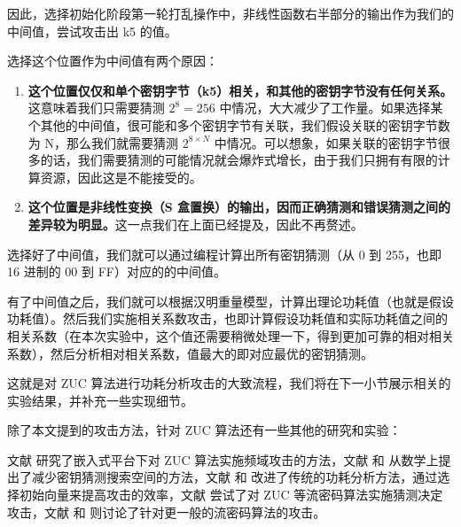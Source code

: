 因此，选择初始化阶段第一轮打乱操作中，非线性函数右半部分的输出作为我们的中间值，尝试攻击出 k5 的值。

\vspace*{\baselineskip}

选择这个位置作为中间值有两个原因：

\begin{enumerate}
    \item \textbf{这个位置仅仅和单个密钥字节（k5）相关，和其他的密钥字节没有任何关系。}这意味着我们只需要猜测 $2^8=256$ 中情况，大大减少了工作量。如果选择某个其他的中间值，很可能和多个密钥字节有关联，我们假设关联的密钥字节数为 N，那么我们就需要猜测 $2^{8 \times N}$ 中情况。可以想象，如果关联的密钥字节很多的话，我们需要猜测的可能情况就会爆炸式增长，由于我们只拥有有限的计算资源，因此这是不能接受的。
    \item \textbf{这个位置是非线性变换（S 盒置换）的输出，因而正确猜测和错误猜测之间的差异较为明显。}这一点我们在上面已经提及，因此不再赘述。
\end{enumerate}

\vspace*{\baselineskip}

选择好了中间值，我们就可以通过编程计算出所有密钥猜测（从 0 到 255，也即 16 进制的 00 到 FF）对应的的中间值。

有了中间值之后，我们就可以根据汉明重量模型，计算出理论功耗值（也就是假设功耗值）。然后我们实施相关系数攻击，也即计算假设功耗值和实际功耗值之间的相关系数（在本次实验中，这个值还需要稍微处理一下，得到更加可靠的相对相关系数），然后分析相对相关系数，值最大的即对应最优的密钥猜测。

这就是对 ZUC 算法进行功耗分析攻击的大致流程，我们将在下一小节展示相关的实验结果，并补充一些实现细节。

\vspace*{\baselineskip}

除了本文提到的攻击方法，针对 ZUC 算法还有一些其他的研究和实验：

文献 \parencite{zuc_freq} 研究了嵌入式平台下对 ZUC 算法实施频域攻击的方法，文献 \parencite{zuc_security} 和 \parencite{zuc_analyical} 从数学上提出了减少密钥猜测搜索空间的方法，文献 \parencite{zuc_iv} 和 \parencite{zuc_wu}改进了传统的功耗分析方法，通过选择初始向量来提高攻击的效率，文献 \parencite{zuc_guess} 尝试了对 ZUC 等流密码算法实施猜测决定攻击，文献 \parencite{stream_fischer} 和 \parencite{stream_gu} 则讨论了针对更一般的流密码算法的攻击。



